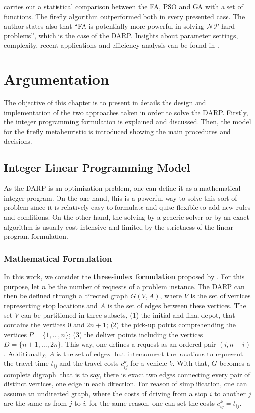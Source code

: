 \documentclass[tuberlin,cic,tc,openright,english,noabntcite,oneside]{iiufrgs}
\begin{document}
\textcite[p. 177]{yang_firefly_2009} carries out a statistical comparison between the FA, PSO and GA with a set of functions. The firefly algorithm outperformed both in every presented case. The author states also that \enquote{FA is potentially more powerful in solving $\mathcal{NP}$-hard problems}, which is the case of the DARP. Insights about parameter settings, complexity, recent applications and efficiency analysis can be found in \textcite{yang_firefly_2013}.

\chapter{Argumentation}
The objective of this chapter is to present in details the design and implementation of the two approaches taken in order to solve the DARP. Firstly, the integer programming formulation is explained and discussed. Then, the model for the firefly metaheuristic is introduced showing the main procedures and decisions.

\section{Integer Linear Programming Model}
As the DARP is an optimization problem, one can define it as a mathematical integer program. On the one hand, this is a powerful way to solve this sort of problem since it is relatively easy to formulate and quite flexible to add new rules and conditions. On the other hand, the solving by a generic solver or by an exact algorithm is usually cost intensive and limited by the strictness of the linear program formulation.

\subsection{Mathematical Formulation}
In this work, we consider the \textbf{three-index formulation} proposed by \textcite[p. 574-575]{cordeau_branch-and-cut_2006}. For this purpose, let $n$ be the number of requests of a problem instance. The DARP can then be defined through a directed graph $G(V,A)$, where $V$ is the set of vertices representing stop locations and $A$ is the set of edges between these vertices. The set $V$ can be partitioned in three subsets, (1) the initial and final depot, that contains the vertices $0$ and $2n+1$; (2) the pick-up points comprehending the vertices $P=\{1,\dotsc,n\}$; (3) the deliver points including the vertices $D=\{n+1,\dotsc,2n\}$. This way, one defines a request as an ordered pair $(i,n+i)$. Additionally, $A$ is the set of edges that interconnect the locations to represent the travel time $t_{ij}$ and the travel costs $c_{ij}^{k}$ for a vehicle $k$. With that, $G$ becomes a complete digraph, that is to say, there is exact two edges connecting every pair of distinct vertices, one edge in each direction. For reason of simplification, one can assume an undirected graph, where the costs of driving from a stop $i$ to another $j$ are the same as from $j$ to $i$, for the same reason, one can set the costs $c_{ij}^{k} = t_{ij}$.
\end{document}
